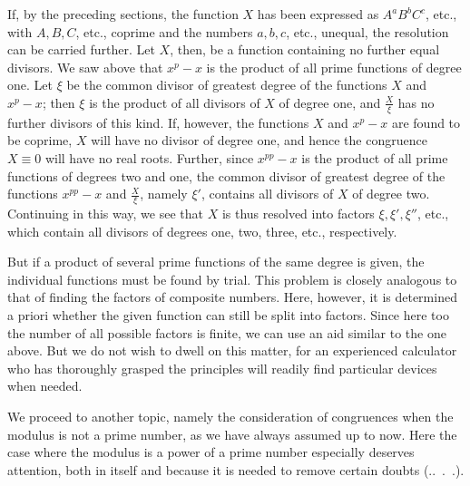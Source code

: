 If, by the preceding sections, the function $X$ has been expressed as $A^aB^bC^c$, etc., with $A,B,C$, etc., coprime and the numbers $a,b,c$, etc., unequal, the resolution can be carried further. Let $X$, then, be a function containing no further equal divisors. We saw above that $x^p-x$ is the product of all prime functions of degree one. Let $\xi$ be the common divisor of greatest degree of the functions $X$ and $x^p-x$; then $\xi$ is the product of all divisors of $X$ of degree one, and $\frac X\xi$ has no further divisors of this kind. If, however, the functions $X$ and $x^p-x$ are found to be coprime, $X$ will have no divisor of degree one, and hence the congruence $X\equiv0$ will have no real roots. Further, since $x^{pp}-x$ is the product of all prime functions of degrees two and one, the common divisor of greatest degree of the functions $x^{pp}-x$ and $\frac X\xi$, namely $\xi'$, contains all divisors of $X$ of degree two. Continuing in this way, we see that $X$ is thus resolved into factors $\xi,\xi',\xi''$, etc., which contain all divisors of degrees one, two, three, etc., respectively.

But if a product of several prime functions of the same degree is given, the individual functions must be found by trial. This problem is closely analogous to that of finding the factors of composite numbers. Here, however, it is determined a priori whether the given function can still be split into factors. Since here too the number of all possible factors is finite, we can use an aid similar to the one above. But we do not wish to dwell on this matter, for an experienced calculator who has thoroughly grasped the principles will readily find particular devices when needed.

We proceed to another topic, namely the consideration of congruences when the modulus is not a prime number, as we have always assumed up to now. Here the case where the modulus is a power of a prime number especially deserves attention, both in itself and because it is needed to remove certain doubts (\textsection.\textsection.\ .\ .).
